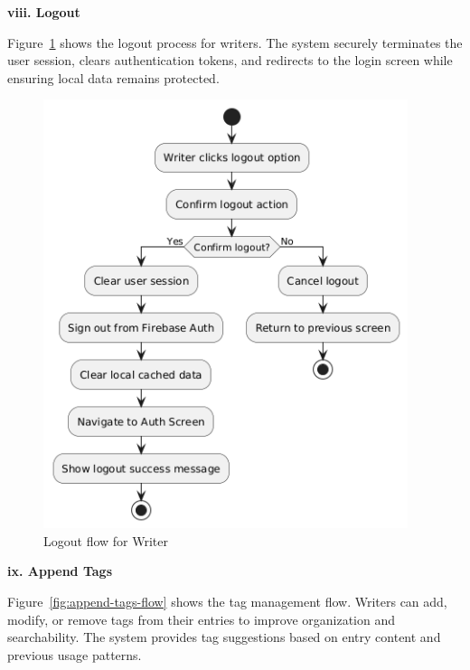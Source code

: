\textbf{viii. Logout}


Figure~\ref{fig:logout-flow} shows the logout process for writers. The system securely terminates the user session, clears authentication tokens, and redirects to the login screen while ensuring local data remains protected.

\begin{figure}[H]
\centering
\includegraphics[width=0.95\textwidth,height=0.7\textheight,keepaspectratio]{files/imgs/logout_flow.png}
\caption{Logout flow for Writer}
\label{fig:logout-flow}
\end{figure}
\clearpage

\textbf{ix. Append Tags}


Figure~\ref{fig:append-tags-flow} shows the tag management flow. Writers can add, modify, or remove tags from their entries to improve organization and searchability. The system provides tag suggestions based on entry content and previous usage patterns.

